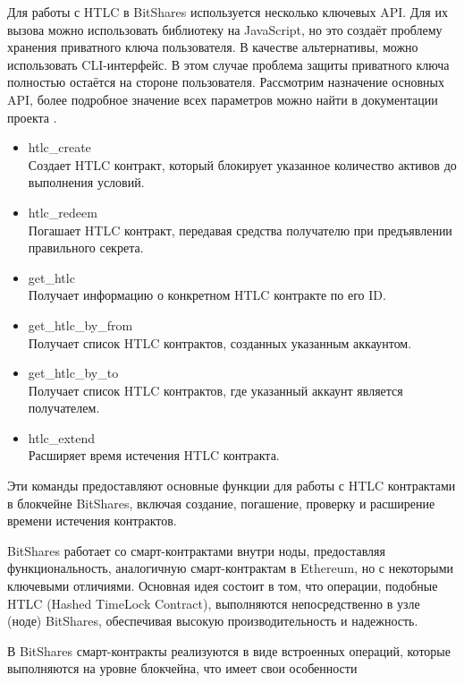 Для работы с HTLC в BitShares используется несколько ключевых API. Для их вызова можно использовать библиотеку на JavaScript, но это создаёт проблему хранения приватного ключа пользователя. В качестве альтернативы, можно использовать CLI-интерфейс. В этом случае проблема защиты приватного ключа полностью остаётся на стороне пользователя. Рассмотрим назначение основных API, более подробное значение всех параметров можно найти в документации проекта \cite{label61}.

\begin{itemize}
\item htlc\_create\\
Создает HTLC контракт, который блокирует указанное количество активов до выполнения условий.
\item htlc\_redeem\\
Погашает HTLC контракт, передавая средства получателю при предъявлении правильного секрета.
\item get\_htlc\\
Получает информацию о конкретном HTLC контракте по его ID.
\item get\_htlc\_by\_from\\
Получает список HTLC контрактов, созданных указанным аккаунтом.
\item get\_htlc\_by\_to\\
Получает список HTLC контрактов, где указанный аккаунт является получателем.
\item htlc\_extend\\
Расширяет время истечения HTLC контракта.
\end{itemize}

Эти команды предоставляют основные функции для работы с HTLC контрактами в блокчейне BitShares, включая создание, погашение, проверку и расширение времени истечения контрактов.

BitShares работает со смарт-контрактами внутри ноды, предоставляя функциональность, аналогичную смарт-контрактам в Ethereum, но с некоторыми ключевыми отличиями. Основная идея состоит в том, что операции, подобные HTLC (Hashed TimeLock Contract), выполняются непосредственно в узле (ноде) BitShares, обеспечивая высокую производительность и надежность.

В BitShares смарт-контракты реализуются в виде встроенных операций, которые выполняются на уровне блокчейна, что имеет свои особенности

